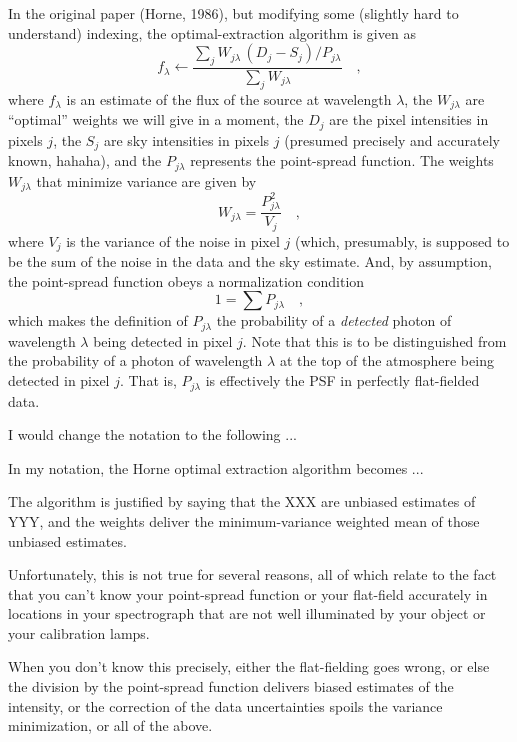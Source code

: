 \documentclass[12pt, letterpaper]{article}
\begin{document}
In the original paper (Horne, 1986), but modifying some (slightly hard
to understand) indexing, the optimal-extraction algorithm is given as
\begin{equation}
f_\lambda \leftarrow \frac{\sum_j W_{j\lambda}\,(D_j - S_j) / P_{j\lambda}}%
                          {\sum_j W_{j\lambda}}
\quad ,
\end{equation}
where $f_\lambda$ is an estimate of the flux of the source at
wavelength $\lambda$, the $W_{j\lambda}$ are ``optimal'' weights we
will give in a moment, the $D_j$ are the pixel intensities in pixels
$j$, the $S_j$ are sky intensities in pixels $j$ (presumed precisely
and accurately known, hahaha), and the $P_{j\lambda}$ represents the
point-spread function.
The weights $W_{j\lambda}$ that minimize variance are given by
\begin{equation}
W_{j\lambda} = \frac{P_{j\lambda}^2}{V_j}
\quad ,
\end{equation}
where $V_j$ is the variance of the noise in pixel $j$ (which,
presumably, is supposed to be the sum of the noise in the data and the
sky estimate.
And, by assumption, the point-spread function obeys a normalization
condition
\begin{equation}
1 = \sum P_{j\lambda}
\quad ,
\end{equation}
which makes the definition of $P_{j\lambda}$ the probability of a
\emph{detected} photon of wavelength $\lambda$ being detected in pixel
$j$.
Note that this is to be distinguished from the probability of a photon
of wavelength $\lambda$ at the top of the atmosphere being detected in
pixel $j$.
That is, $P_{j\lambda}$ is effectively the PSF in perfectly
flat-fielded data.

I would change the notation to the following ...

In my notation, the Horne optimal extraction algorithm becomes ...

The algorithm is justified by saying that the XXX are unbiased
estimates of YYY, and the weights deliver the minimum-variance
weighted mean of those unbiased estimates.

Unfortunately, this is not true for several reasons, all of which
relate to the fact that you can't know your point-spread function or
your flat-field accurately in locations in your spectrograph that are
not well illuminated by your object or your calibration lamps.

When you don't know this precisely, either the flat-fielding goes
wrong, or else the division by the point-spread function delivers
biased estimates of the intensity, or the correction of the data
uncertainties spoils the variance minimization, or all of the above.
\end{document}
